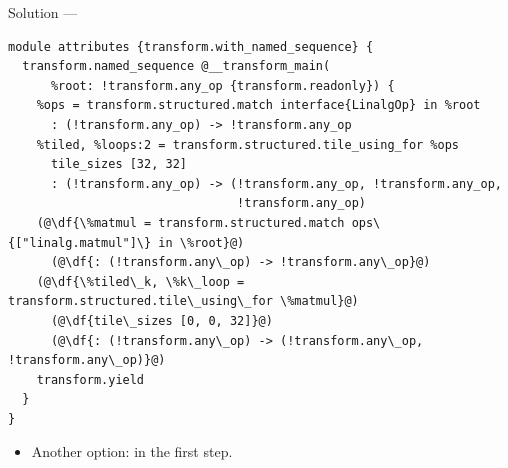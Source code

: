 \documentclass[aspectratio=169,10pt]{beamer}
\begin{document}
\begin{frame}[fragile]{Solution --- }
\begin{lstlisting}[language=mlir,basicstyle=\ttfamily\fontsize{6.6}{7.9}\selectfont]
module attributes {transform.with_named_sequence} {
  transform.named_sequence @__transform_main(
      %root: !transform.any_op {transform.readonly}) {
    %ops = transform.structured.match interface{LinalgOp} in %root
      : (!transform.any_op) -> !transform.any_op
    %tiled, %loops:2 = transform.structured.tile_using_for %ops
      tile_sizes [32, 32]
      : (!transform.any_op) -> (!transform.any_op, !transform.any_op,
                                !transform.any_op)
    (@\df{\%matmul = transform.structured.match ops\{["linalg.matmul"]\} in \%root}@)
      (@\df{: (!transform.any\_op) -> !transform.any\_op}@)
    (@\df{\%tiled\_k, \%k\_loop = transform.structured.tile\_using\_for \%matmul}@)
      (@\df{tile\_sizes [0, 0, 32]}@)
      (@\df{: (!transform.any\_op) -> (!transform.any\_op, !transform.any\_op)}@)
    transform.yield
  }
}
\end{lstlisting}
  \vspace{0.2em}
  \begin{itemize}
    \item<2-> Another option: \cd{[32, 32, 32]} in the first step.
  \end{itemize}
\end{frame}
\end{document}
